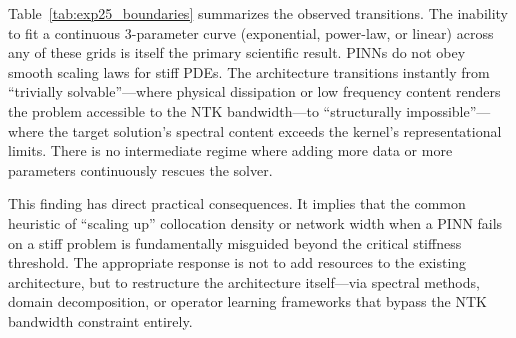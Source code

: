 Table~\ref{tab:exp25_boundaries} summarizes the observed transitions. The inability to fit a continuous 3-parameter curve (exponential, power-law, or linear) across any of these grids is itself the primary scientific result. PINNs do not obey smooth scaling laws for stiff PDEs. The architecture transitions instantly from ``trivially solvable''—where physical dissipation or low frequency content renders the problem accessible to the NTK bandwidth—to ``structurally impossible''—where the target solution's spectral content exceeds the kernel's representational limits. There is no intermediate regime where adding more data or more parameters continuously rescues the solver.

This finding has direct practical consequences. It implies that the common heuristic of ``scaling up'' collocation density or network width when a PINN fails on a stiff problem is fundamentally misguided beyond the critical stiffness threshold. The appropriate response is not to add resources to the existing architecture, but to restructure the architecture itself—via spectral methods, domain decomposition, or operator learning frameworks that bypass the NTK bandwidth constraint entirely.
